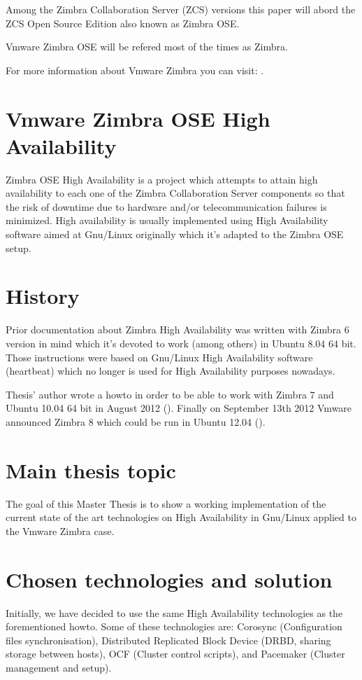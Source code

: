 Among the Zimbra Collaboration Server (ZCS) versions this paper will abord the ZCS Open Source Edition also known as Zimbra OSE.

Vmware Zimbra OSE will be refered most of the times as Zimbra.

For more information about Vmware Zimbra you can visit: \cite{ZimbraLearn}.

\section {Vmware Zimbra OSE High Availability}
Zimbra OSE High Availability is a project which attempts to attain high availability to each one of the Zimbra Collaboration Server components so that the risk of downtime due to hardware and/or telecommunication failures is minimized. High availability is usually implemented using High Availability software aimed at Gnu/Linux originally which it's adapted to the Zimbra OSE setup.


\section{History}

Prior documentation about Zimbra High Availability was written with Zimbra 6 version in mind which it's devoted to work (among others) in Ubuntu 8.04 64 bit. Those instructions were based on Gnu/Linux High Availability software (heartbeat) which no longer is used for High Availability purposes nowadays.

Thesis' author wrote a howto in order to be able to work with Zimbra 7 and Ubuntu 10.04 64 bit in August 2012 (\cite{BtacticZimbraHAHowto}). Finally on September 13th 2012 Vmware announced Zimbra 8 which could be run in Ubuntu 12.04 (\cite{VmwareZimbra8Announce}).

\section {Main thesis topic}
The goal of this Master Thesis is to show a working implementation of the current state of the art technologies on High Availability in Gnu/Linux applied to the Vmware Zimbra case.

\section {Chosen technologies and solution}
Initially, we have decided to use the same High Availability technologies as the forementioned howto. Some of these technologies are: Corosync (Configuration files synchronisation), Distributed Replicated Block Device (DRBD, sharing storage between hosts), OCF (Cluster control scripts), and Pacemaker (Cluster management and setup).

